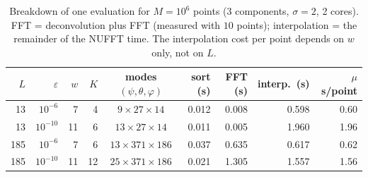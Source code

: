 \begin{table}[!htbp]\centering\small
\caption{Breakdown of one evaluation for $M=10^6$ points (3 components, $\sigma=2$, 2 cores). FFT = deconvolution plus FFT
(measured with $10$ points); interpolation = the remainder of the NUFFT time. The interpolation cost per point depends on
$w$ only, not on $L$.}\label{tab:breakdown}
\begin{tabular}{rrrrcrrrr}\toprule
$L$&$\varepsilon$&$w$&$K$&modes $(\psi,\theta,\varphi)$&sort (s)&FFT (s)&interp.\ (s)&$\mu$s/point\\\midrule
13 & $10^{-6}$ & 7 & 4 & $9\times27\times14$ & 0.012 & 0.008 & 0.598 & 0.60\\
13 & $10^{-10}$ & 11 & 6 & $13\times27\times14$ & 0.011 & 0.005 & 1.960 & 1.96\\
185 & $10^{-6}$ & 7 & 6 & $13\times371\times186$ & 0.037 & 0.635 & 0.617 & 0.62\\
185 & $10^{-10}$ & 11 & 12 & $25\times371\times186$ & 0.021 & 1.305 & 1.557 & 1.56\\
\bottomrule\end{tabular}\end{table}

